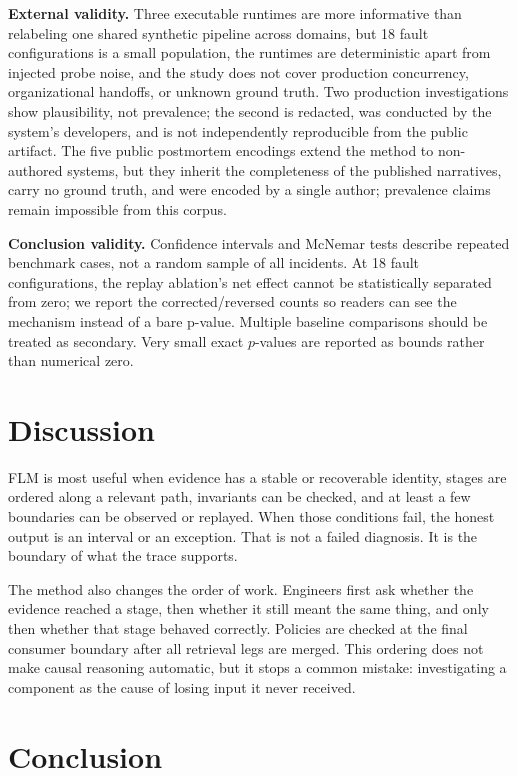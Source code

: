 \documentclass[10pt]{article}
\begin{document}
\textbf{External validity.} Three executable runtimes are more informative than relabeling one shared synthetic pipeline across domains, but 18 fault configurations is a small population, the runtimes are deterministic apart from injected probe noise, and the study does not cover production concurrency, organizational handoffs, or unknown ground truth. Two production investigations show plausibility, not prevalence; the second is redacted, was conducted by the system's developers, and is not independently reproducible from the public artifact. The five public postmortem encodings extend the method to non-authored systems, but they inherit the completeness of the published narratives, carry no ground truth, and were encoded by a single author; prevalence claims remain impossible from this corpus.

\textbf{Conclusion validity.} Confidence intervals and McNemar tests describe repeated benchmark cases, not a random sample of all incidents. At 18 fault configurations, the replay ablation's net effect cannot be statistically separated from zero; we report the corrected/reversed counts so readers can see the mechanism instead of a bare p-value. Multiple baseline comparisons should be treated as secondary. Very small exact $p$-values are reported as bounds rather than numerical zero.

\section{Discussion}

FLM is most useful when evidence has a stable or recoverable identity, stages are ordered along a relevant path, invariants can be checked, and at least a few boundaries can be observed or replayed. When those conditions fail, the honest output is an interval or an exception. That is not a failed diagnosis. It is the boundary of what the trace supports.

The method also changes the order of work. Engineers first ask whether the evidence reached a stage, then whether it still meant the same thing, and only then whether that stage behaved correctly. Policies are checked at the final consumer boundary after all retrieval legs are merged. This ordering does not make causal reasoning automatic, but it stops a common mistake: investigating a component as the cause of losing input it never received.

\section{Conclusion}
\end{document}
